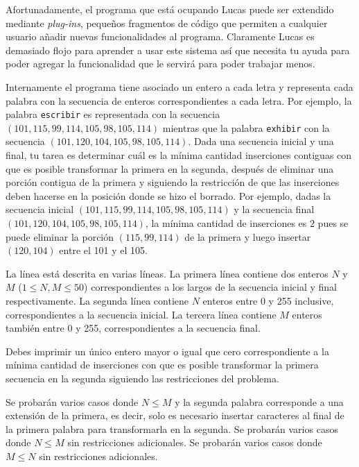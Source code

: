 \documentclass{oci}
\begin{document}
\begin{problemDescription}
  Afortunadamente, el programa que está ocupando Lucas puede ser extendido
  mediante \emph{plug-ins}, pequeños fragmentos de código que permiten a 
  cualquier usuario añadir nuevas funcionalidades al programa.
  Claramente Lucas es demasiado flojo para aprender a usar este sistema así que
  necesita tu ayuda para poder agregar la funcionalidad que le servirá para
  poder trabajar menos.

  Internamente el programa tiene asociado un entero a cada letra y representa
  cada palabra con la secuencia de enteros correspondientes a cada letra.
  Por ejemplo, la palabra \texttt{escribir} es representada con la secuencia
  $(101,115,99,114,105,98,105,114)$ mientras que la palabra \texttt{exhibir} con
  la secuencia $(101,120,104,105,98,105,114)$.
  Dada una secuencia inicial y una final, tu tarea es determinar cuál es la
  mínima cantidad inserciones contiguas con que es posible transformar la
  primera en la segunda, después de eliminar una porción contigua de la primera y
  siguiendo la restricción de que las inserciones deben hacerse en la posición
  donde se hizo el borrado.
  Por ejemplo, dadas la secuencia inicial $(101,115,99,114,105,98,105,114)$ y la
  secuencia final $(101,120,104,105,98,105,114)$, la mínima cantidad de
  inserciones es $2$ pues se puede eliminar la porción $(115,99,114)$ de la
  primera y luego insertar $(120,104)$ entre el 101 y el 105.
\end{problemDescription}

\begin{inputDescription}
  La línea está descrita en varias líneas.
  La primera línea contiene dos enteros $N$ y $M$ ($1\leq N,M \leq 50$)
  correspondientes a los largos de la secuencia inicial y final respectivamente.
  La segunda línea contiene $N$ enteros entre 0 y 255 inclusive,
  correspondientes a la secuencia inicial.
  La tercera línea contiene $M$ enteros también entre 0 y 255, correspondientes
  a la secuencia final.
\end{inputDescription}

\begin{outputDescription}
  Debes imprimir un único entero mayor o igual que cero correspondiente a la
  mínima cantidad de inserciones con que es posible transformar la primera
  secuencia en la segunda siguiendo las restricciones del problema.
\end{outputDescription}

\begin{scoreDescription}
   Se probarán varios casos donde $N \leq M$ y la segunda palabra corresponde a
  una extensión de la primera, es decir, solo es necesario insertar caracteres
  al final de la primera palabra para transformarla en la segunda.
   Se probarán varios casos donde $N\leq M$ sin restricciones adicionales.
   Se probarán varios casos donde $M\leq N$ sin restricciones adicionales.
\end{scoreDescription}

\begin{sampleDescription}
\end{sampleDescription}
\end{document}

